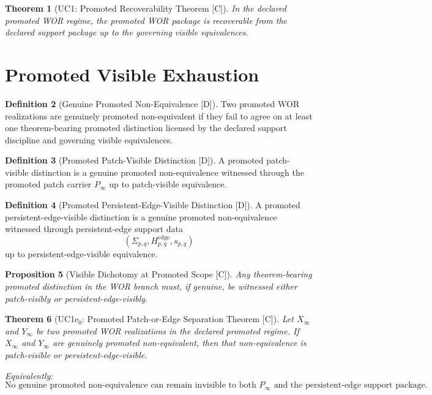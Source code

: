 \documentclass[11pt]{article}
\newtheorem{theorem}{Theorem}[section]
\newtheorem{proposition}[theorem]{Proposition}
\theoremstyle{definition}
\newtheorem{definition}[theorem]{Definition}
\theoremstyle{remark}
\newcommand{\C}{\textnormal{[C]}}
\newcommand{\D}{\textnormal{[D]}}
\newcommand{\Pinf}{P_\infty}
\newcommand{\Xinf}{X_\infty}
\newcommand{\Sigmaedge}{\Sigma_{p,q}}
\newcommand{\Hedge}{H^{\mathrm{edge}}_{p,q}}
\newcommand{\scopepq}{s_{p,q}}
\begin{document}
\begin{theorem}[UC1: Promoted Recoverability Theorem {\C}]
In the declared promoted WOR regime, the promoted WOR package is recoverable from the declared support package up to the governing visible equivalences.
\end{theorem}

\section{Promoted Visible Exhaustion}

\begin{definition}[Genuine Promoted Non-Equivalence {\D}]
Two promoted WOR realizations are genuinely promoted non-equivalent if they fail to agree on at least one theorem-bearing promoted distinction licensed by the declared support discipline and governing visible equivalences.
\end{definition}

\begin{definition}[Promoted Patch-Visible Distinction {\D}]
A promoted patch-visible distinction is a genuine promoted non-equivalence witnessed through the promoted patch carrier \(\Pinf\) up to patch-visible equivalence.
\end{definition}

\begin{definition}[Promoted Persistent-Edge-Visible Distinction {\D}]
A promoted persistent-edge-visible distinction is a genuine promoted non-equivalence witnessed through persistent-edge support data
\[
(\Sigmaedge,\Hedge,\scopepq)
\]
up to persistent-edge-visible equivalence.
\end{definition}

\begin{proposition}[Visible Dichotomy at Promoted Scope {\C}]
Any theorem-bearing promoted distinction in the WOR branch must, if genuine, be witnessed either patch-visibly or persistent-edge-visibly.
\end{proposition}

\begin{theorem}[UC1e$_0$: Promoted Patch-or-Edge Separation Theorem {\C}]
Let \(\Xinf\) and \(Y_\infty\) be two promoted WOR realizations in the declared promoted regime. If \(\Xinf\) and \(Y_\infty\) are genuinely promoted non-equivalent, then that non-equivalence is patch-visible or persistent-edge-visible.

Equivalently:
\[
\boxed{
\text{No genuine promoted non-equivalence can remain invisible to both }\Pinf\text{ and the persistent-edge support package.}
}
\]
\end{theorem}
\end{document}
